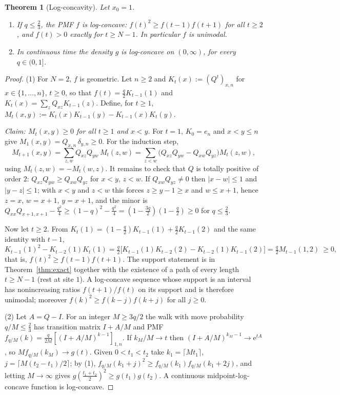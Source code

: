 \documentclass[11pt,a4paper]{article}
\newtheorem{theorem}{Theorem}[section]
\theoremstyle{definition}
\theoremstyle{remark}
\newcommand{\ee}{\mathrm{e}}
\begin{document}
\begin{theorem}[Log-concavity]\label{thm:logconcave}
Let $x_0=1$.
\begin{enumerate}
\item If $q\le\frac23$, the PMF $f$ is log-concave: $f(t)^2\ge f(t-1)f(t+1)$ for all $t\ge2$, and $f(t)>0$
exactly for $t\ge N-1$. In particular $f$ is unimodal.
\item In continuous time the density $g$ is log-concave on $(0,\infty)$, for every $q\in(0,1]$.
\end{enumerate}
\end{theorem}
\begin{proof}
(1) For $N=2$, $f$ is geometric. Let $n\ge2$ and $K_t(x):=(Q^t)_{x,n}$ for $x\in\{1,\dots,n\}$, $t\ge0$, so that
$f(t)=\frac q2K_{t-1}(1)$ and $K_t(x)=\sum_zQ_{xz}K_{t-1}(z)$. Define, for $t\ge1$,
$M_t(x,y):=K_t(x)K_{t-1}(y)-K_{t-1}(x)K_t(y)$.

\emph{Claim: $M_t(x,y)\ge0$ for all $t\ge1$ and $x<y$.}
For $t=1$, $K_0=e_n$ and $x<y\le n$ give $M_1(x,y)=Q_{x,n}\,\delta_{y,n}\ge0$. For the induction step,
\[
  M_{t+1}(x,y)=\sum_{z,w}Q_{xz}Q_{yw}\,M_t(z,w)=\sum_{z<w}\bigl(Q_{xz}Q_{yw}-Q_{xw}Q_{yz}\bigr)M_t(z,w),
\]
using $M_t(z,w)=-M_t(w,z)$. It remains to check that $Q$ is totally positive of order $2$:
$Q_{xz}Q_{yw}\ge Q_{xw}Q_{yz}$ for $x<y$, $z<w$. If $Q_{xw}Q_{yz}\ne0$ then $|x-w|\le1$ and $|y-z|\le1$;
with $x<y$ and $z<w$ this forces $z\ge y-1\ge x$ and $w\le x+1$, hence $z=x$, $w=x+1$, $y=x+1$, and the minor is
$Q_{xx}Q_{x+1,x+1}-\frac{q^2}4\ge(1-q)^2-\frac{q^2}{4}=(1-\frac{3q}2)(1-\frac q2)\ge0$ for $q\le\frac23$.

Now let $t\ge2$. From $K_t(1)=(1-\frac q2)K_{t-1}(1)+\frac q2K_{t-1}(2)$ and the same identity with $t-1$,
\[
  K_{t-1}(1)^2-K_{t-2}(1)K_t(1)=\tfrac q2\bigl[K_{t-1}(1)K_{t-2}(2)-K_{t-2}(1)K_{t-1}(2)\bigr]
  =\tfrac q2M_{t-1}(1,2)\ \ge0 ,
\]
that is, $f(t)^2\ge f(t-1)f(t+1)$. The support statement is in Theorem~\ref{thm:exact} together with the
existence of a path of every length $t\ge N-1$ (rest at site $1$). A log-concave sequence whose support is an
interval has nonincreasing ratios $f(t+1)/f(t)$ on its support and is therefore unimodal; moreover
$f(k)^2\ge f(k-j)f(k+j)$ for all $j\ge0$.

(2) Let $A=Q-I$. For an integer $M\ge 3q/2$ the walk with move probability $q/M\le\frac23$ has transition matrix
$I+A/M$ and PMF $f_{q/M}(k)=\frac{q}{2M}[(I+A/M)^{k-1}]_{1,n}$. If $k_M/M\to t$ then
$(I+A/M)^{k_M-1}\to\ee^{tA}$, so $Mf_{q/M}(k_M)\to g(t)$. Given $0<t_1<t_2$ take $k_1=\lceil Mt_1\rceil$,
$j=\lceil M(t_2-t_1)/2\rceil$; by (1), $f_{q/M}(k_1+j)^2\ge f_{q/M}(k_1)f_{q/M}(k_1+2j)$, and letting
$M\to\infty$ gives $g(\frac{t_1+t_2}2)^2\ge g(t_1)g(t_2)$. A continuous midpoint-log-concave function is
log-concave.
\end{proof}
\end{document}
